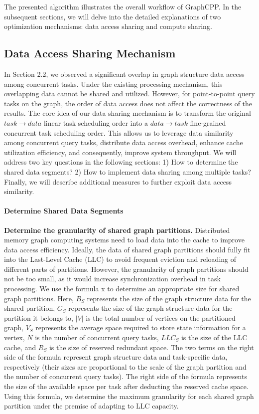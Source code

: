 \documentclass[lettersize,journal]{IEEEtran} %
\begin{document}
The presented algorithm illustrates the overall workflow of GraphCPP. In the subsequent sections, we will delve into the detailed explanations of two optimization mechanisms: data access sharing and compute sharing.

\subsection{Data Access Sharing Mechanism}
In Section 2.2, we observed a significant overlap in graph structure data access among concurrent tasks. Under the existing processing mechanism, this overlapping data cannot be shared and utilized. However, for point-to-point query tasks on the graph, the order of data access does not affect the correctness of the results. The core idea of our data sharing mechanism is to transform the original $task \rightarrow data$ linear task scheduling order into a $data \rightarrow task$ fine-grained concurrent task scheduling order. This allows us to leverage data similarity among concurrent query tasks, distribute data access overhead, enhance cache utilization efficiency, and consequently, improve system throughput. We will address two key questions in the following sections: 1) How to determine the shared data segments? 2) How to implement data sharing among multiple tasks? Finally, we will describe additional measures to further exploit data access similarity.

\paragraph{Determine Shared Data Segments}

{\bf{Determine the granularity of shared graph partitions.}} Distributed memory graph computing systems need to load data into the cache to improve data access efficiency. Ideally, the data of shared graph partitions should fully fit into the Last-Level Cache (LLC) to avoid frequent eviction and reloading of different parts of partitions. However, the granularity of graph partitions should not be too small, as it would increase synchronization overhead in task processing. We use the formula x to determine an appropriate size for shared graph partitions. Here, $B_S$ represents the size of the graph structure data for the shared partition, $G_S$ represents the size of the graph structure data for the partition it belongs to, $|V|$ is the total number of vertices on the partitioned graph, $V_S$ represents the average space required to store state information for a vertex, $N$ is the number of concurrent query tasks, $LLC_S$ is the size of the LLC cache, and $R_S$ is the size of reserved redundant space. The two terms on the right side of the formula represent graph structure data and task-specific data, respectively (their sizes are proportional to the scale of the graph partition and the number of concurrent query tasks). The right side of the formula represents the size of the available space per task after deducting the reserved cache space. Using this formula, we determine the maximum granularity for each shared graph partition under the premise of adapting to LLC capacity.
\end{document}
